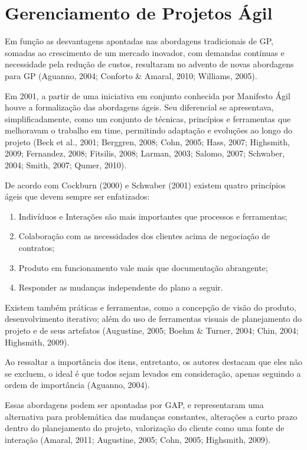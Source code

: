 \section{Gerenciamento de Projetos Ágil}
Em função as desvantagens apontadas nas abordagens tradicionais de GP, somadas ao crescimento de um mercado inovador, com demandas contínuas e necessidade pela redução de custos, resultaram no advento de novas abordagens para GP (Aguanno, 2004; Conforto \& Amaral, 2010; Williams, 2005).

Em 2001, a partir de uma iniciativa em conjunto conhecida por Manifesto Ágil houve a formalização das abordagens ágeis. Seu diferencial se apresentava, simplificadamente, como um conjunto de técnicas, princípios e ferramentas que melhoravam o trabalho em time, permitindo adaptação e evoluções ao longo do projeto (Beck et al., 2001; Berggren, 2008; Cohn, 2005; Hass, 2007; Highsmith, 2009; Fernandez, 2008; Fitsilis, 2008; Larman, 2003; Salomo, 2007; Schwaber, 2004; Smith, 2007; Qumer, 2010).

De acordo com Cockburn (2000) e Schwaber (2001) existem quatro princípios ágeis que devem sempre ser enfatizados:

\begin{enumerate}
    \item{Indivíduos e Interações são mais importantes que processos e ferramentas;}
    \item{Colaboração com as necessidades dos clientes acima de negociação de contratos;}
    \item{Produto em funcionamento vale mais que documentação abrangente;}
    \item{Responder as mudanças independente do plano a seguir.}
\end{enumerate}

Existem também práticas e ferramentas, como a concepção de visão do produto, desenvolvimento iterativo; além do uso de ferramentas visuais de planejamento do projeto e de seus artefatos (Augustine, 2005; Boehm \& Turner, 2004; Chin, 2004; Highsmith, 2009).

Ao ressaltar a importância dos itens, entretanto, os autores destacam que eles não se excluem, o ideal é que todos sejam levados em consideração, apenas seguindo a ordem de importância (Aguanno, 2004).

Essas abordagens podem ser apontadas por GAP, e representaram uma alternativa para problemática das mudanças constantes, alterações a curto prazo dentro do planejamento do projeto, valorização do cliente como uma fonte de interação (Amaral, 2011; Augustine, 2005; Cohn, 2005; Highsmith, 2009).

